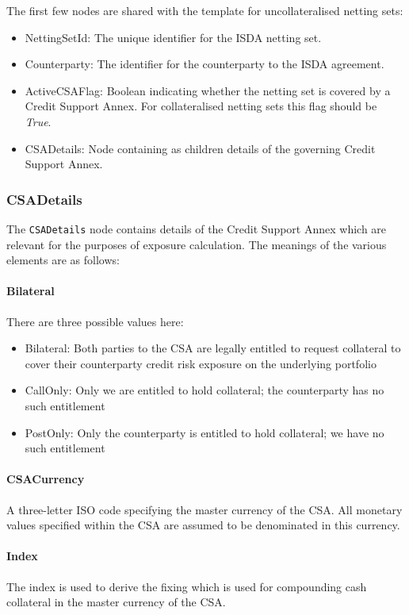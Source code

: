 The first few nodes are shared with the template for uncollateralised
netting sets:
\begin{itemize}
\item NettingSetId: The unique identifier for the ISDA netting set.
\item Counterparty: The identifier for the counterparty to the ISDA agreement.
\item ActiveCSAFlag: Boolean indicating whether the netting set is
  covered by a Credit Support Annex. For collateralised netting sets
  this flag should be \emph{True}.
\item CSADetails: Node containing as children details of the governing
  Credit Support Annex. 
\end{itemize}

\subsubsection*{CSADetails}

The \lstinline!CSADetails! node contains details of the Credit Support
Annex which are relevant for the purposes of exposure calculation. The
meanings of the various elements are as follows:

\paragraph{Bilateral} There are three possible values here:
\begin{itemize}
\item Bilateral: Both parties to the CSA are legally entitled to
  request collateral to cover their counterparty credit risk exposure
  on the underlying portfolio
\item CallOnly: Only we are entitled to hold collateral; the
  counterparty has no such entitlement
\item PostOnly: Only the counterparty is entitled to hold collateral;
  we have no such entitlement
\end{itemize}

\paragraph{CSACurrency} A three-letter ISO code specifying the master
currency of the CSA. All monetary values specified within the CSA are
assumed to be denominated in this currency.

\paragraph{Index} The index is used to derive the fixing which is used
for compounding cash collateral in the master currency of the CSA.

